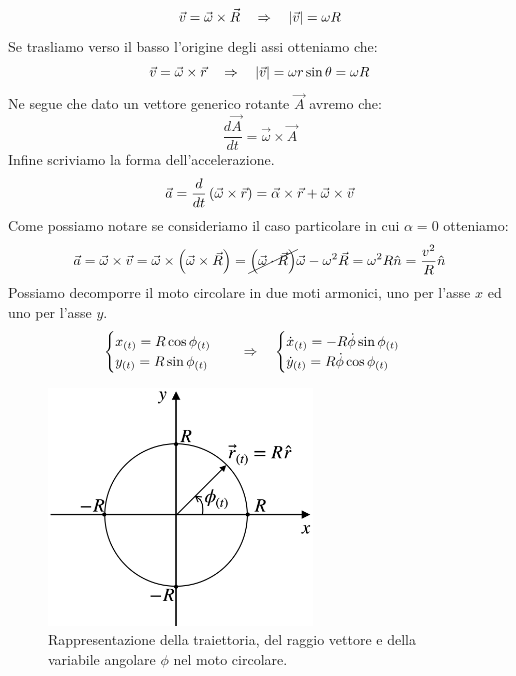 \begin{equation}
    \vec v = \vec\omega\times\vec R\quad\Rightarrow\quad \left| \vec v \right|  = \omega R
\end{equation}
Se trasliamo verso il basso l'origine degli assi otteniamo che:
\begin{equation}
    \vec v = \vec\omega\times\vec r\quad\Rightarrow\quad \left| \vec v \right|  = \omega r\sin\theta = \omega R
\label{eq:v(w)}
\end{equation}
Ne segue che dato un vettore generico rotante $\vec A$ avremo che:
\begin{equation}
    \frac{d\vec A}{dt} = \vec\omega\times\vec A
\label{eq:rotantvector}
\end{equation}
Infine scriviamo la forma dell'accelerazione.
\begin{equation}
    \vec a = \frac d{dt}\left(\vec\omega\times\vec r\right) =
    \vec \alpha\times \vec r + \vec\omega\times\vec v
\label{eq:a_vec}
\end{equation}
Come possiamo notare se consideriamo il caso particolare in cui $\alpha = 0$
otteniamo:
\begin{equation}
    \vec a = \vec \omega\times\vec v = \vec \omega\times\left( \vec\omega\times
    \vec R\right) = \cancel{\left(\vec\omega\cdot\vec R\right)}\vec\omega - \omega^2\vec R
    = \omega^2R\hat n = \frac{v^2}R\hat n
\label{eq:an_vec}
\end{equation}
Possiamo decomporre il moto circolare in due moti armonici, uno per l'asse $x$ ed uno per l'asse $y$.
\begin{equation}
    \begin{cases}
        x_{(t)} = R\cos\phi_{(t)}\\
        y_{(t)} = R\sin\phi_{(t)}\\
    \end{cases}\quad\Rightarrow\quad
    \begin{cases}
        \dot x_{(t)} = -R\dot\phi\sin\phi_{(t)}\\
        \dot y_{(t)} = R\dot\phi\cos\phi_{(t)}
    \end{cases}
\label{eq:components}
\end{equation}

\begin{figure}[htbp]
    \centering
        \includegraphics[width=7cm]{images/circ.png}
        \caption{Rappresentazione della traiettoria, del raggio vettore e della variabile angolare $\phi$ nel moto circolare.}
\label{fig:circ}
\end{figure}